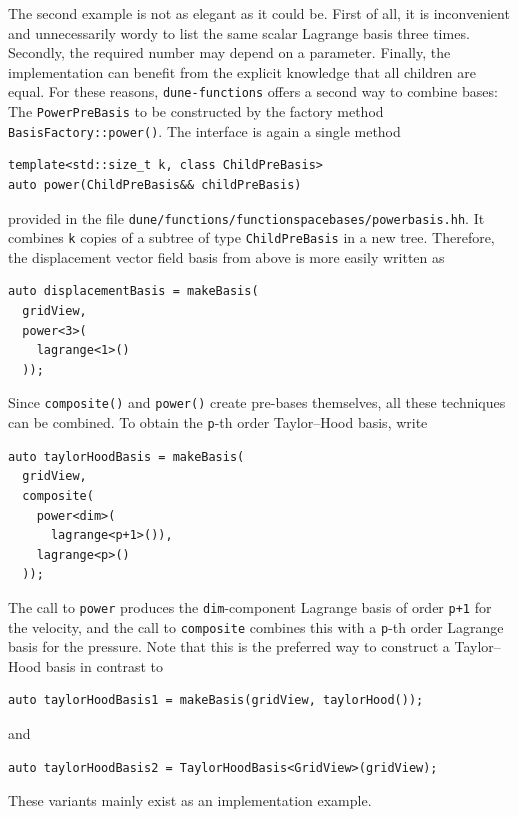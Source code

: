 \documentclass[a4paper,10pt,headings=normal,bibliography=totoc]{scrartcl}
\newcommand{\cpp}[1]{\lstinline[basicstyle=\ttfamily]!#1!}
\newcommand{\dunemodule}[1]{\texttt{#1}}
\newcommand{\file}[1]{\texttt{#1}}
\begin{document}
The second example is not as elegant as it could be.  First of all, it is inconvenient and unnecessarily
wordy to list the same scalar Lagrange basis three times.  Secondly, the required number may depend on
a parameter.
Finally, the implementation can benefit from the explicit knowledge that
all children are equal.
For these reasons, \dunemodule{dune-functions}
offers a second way to combine bases: The \cpp{PowerPreBasis}
to be constructed by the factory method \cpp{BasisFactory::power()}.
The interface is again a single method
\begin{lstlisting}[style=Interface]
template<std::size_t k, class ChildPreBasis>
auto power(ChildPreBasis&& childPreBasis)
\end{lstlisting}
provided in the file \file{dune/functions/functionspacebases/powerbasis.hh}.
It combines \cpp{k} copies of a subtree of type \cpp{ChildPreBasis} in a new tree.  Therefore, the
displacement vector field basis from above is more easily written as
\begin{lstlisting}[style=Example]
auto displacementBasis = makeBasis(
  gridView,
  power<3>(
    lagrange<1>()
  ));
\end{lstlisting}
Since \cpp{composite()} and \cpp{power()} create pre-bases themselves,
all these techniques can be combined. To obtain the \cpp{p}-th order Taylor--Hood basis,
write
\begin{lstlisting}[style=Example]
auto taylorHoodBasis = makeBasis(
  gridView,
  composite(
    power<dim>(
      lagrange<p+1>()),
    lagrange<p>()
  ));
\end{lstlisting}
The call to \cpp{power} produces the \cpp{dim}-component Lagrange basis of order \cpp{p+1} for the velocity,
and the call to \cpp{composite} combines this with a \cpp{p}-th order Lagrange basis for the pressure.
Note that this is the preferred way to construct a Taylor--Hood basis in contrast to
\begin{lstlisting}[style=Example]
auto taylorHoodBasis1 = makeBasis(gridView, taylorHood());
\end{lstlisting}
and
\begin{lstlisting}[style=Example]
auto taylorHoodBasis2 = TaylorHoodBasis<GridView>(gridView);
\end{lstlisting}
These variants mainly exist as an implementation example.
\end{document}
